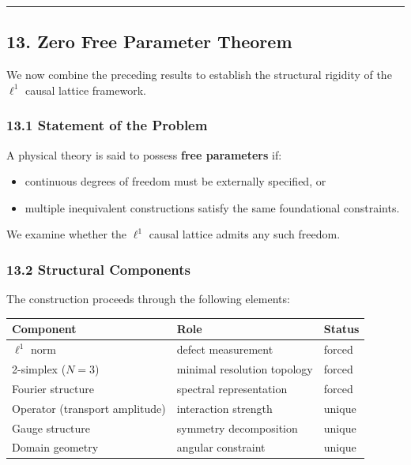 \documentclass[
]{article}
\providecommand{\tightlist}{%
  \setlength{\itemsep}{0pt}\setlength{\parskip}{0pt}}
\begin{document}
\begin{center}\rule{0.5\linewidth}{0.5pt}\end{center}

\subsection{13. Zero Free Parameter
Theorem}\label{zero-free-parameter-theorem}

We now combine the preceding results to establish the structural
rigidity of the \(\ell^1\) causal lattice framework.

\subsubsection{13.1 Statement of the
Problem}\label{statement-of-the-problem}

A physical theory is said to possess \textbf{free parameters} if:

\begin{itemize}
\tightlist
\item
  continuous degrees of freedom must be externally specified, or
\item
  multiple inequivalent constructions satisfy the same foundational
  constraints.
\end{itemize}

We examine whether the \(\ell^1\) causal lattice admits any such
freedom.

\subsubsection{13.2 Structural Components}\label{structural-components}

The construction proceeds through the following elements:

\begin{longtable}[]{@{}lll@{}}
\toprule\noalign{}
Component & Role & Status \\
\midrule\noalign{}
\endhead
\bottomrule\noalign{}
\endlastfoot
\(\ell^1\) norm & defect measurement & forced \\
2-simplex (\(N = 3\)) & minimal resolution topology & forced \\
Fourier structure & spectral representation & forced \\
Operator (transport amplitude) & interaction strength & unique \\
Gauge structure & symmetry decomposition & unique \\
Domain geometry & angular constraint & unique \\
\end{longtable}
\end{document}
